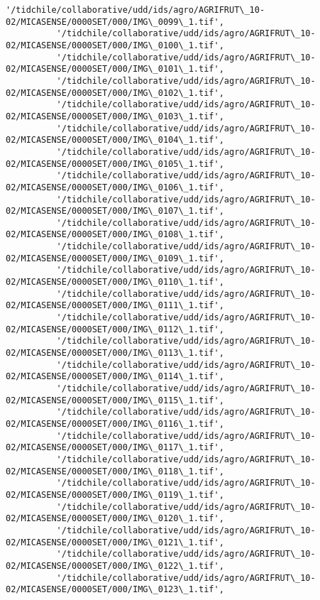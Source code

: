 \documentclass[11pt]{article}
\begin{document}
\begin{Verbatim}[commandchars=\\\{\}]
          '/tidchile/collaborative/udd/ids/agro/AGRIFRUT\_10-02/MICASENSE/0000SET/000/IMG\_0099\_1.tif',
          '/tidchile/collaborative/udd/ids/agro/AGRIFRUT\_10-02/MICASENSE/0000SET/000/IMG\_0100\_1.tif',
          '/tidchile/collaborative/udd/ids/agro/AGRIFRUT\_10-02/MICASENSE/0000SET/000/IMG\_0101\_1.tif',
          '/tidchile/collaborative/udd/ids/agro/AGRIFRUT\_10-02/MICASENSE/0000SET/000/IMG\_0102\_1.tif',
          '/tidchile/collaborative/udd/ids/agro/AGRIFRUT\_10-02/MICASENSE/0000SET/000/IMG\_0103\_1.tif',
          '/tidchile/collaborative/udd/ids/agro/AGRIFRUT\_10-02/MICASENSE/0000SET/000/IMG\_0104\_1.tif',
          '/tidchile/collaborative/udd/ids/agro/AGRIFRUT\_10-02/MICASENSE/0000SET/000/IMG\_0105\_1.tif',
          '/tidchile/collaborative/udd/ids/agro/AGRIFRUT\_10-02/MICASENSE/0000SET/000/IMG\_0106\_1.tif',
          '/tidchile/collaborative/udd/ids/agro/AGRIFRUT\_10-02/MICASENSE/0000SET/000/IMG\_0107\_1.tif',
          '/tidchile/collaborative/udd/ids/agro/AGRIFRUT\_10-02/MICASENSE/0000SET/000/IMG\_0108\_1.tif',
          '/tidchile/collaborative/udd/ids/agro/AGRIFRUT\_10-02/MICASENSE/0000SET/000/IMG\_0109\_1.tif',
          '/tidchile/collaborative/udd/ids/agro/AGRIFRUT\_10-02/MICASENSE/0000SET/000/IMG\_0110\_1.tif',
          '/tidchile/collaborative/udd/ids/agro/AGRIFRUT\_10-02/MICASENSE/0000SET/000/IMG\_0111\_1.tif',
          '/tidchile/collaborative/udd/ids/agro/AGRIFRUT\_10-02/MICASENSE/0000SET/000/IMG\_0112\_1.tif',
          '/tidchile/collaborative/udd/ids/agro/AGRIFRUT\_10-02/MICASENSE/0000SET/000/IMG\_0113\_1.tif',
          '/tidchile/collaborative/udd/ids/agro/AGRIFRUT\_10-02/MICASENSE/0000SET/000/IMG\_0114\_1.tif',
          '/tidchile/collaborative/udd/ids/agro/AGRIFRUT\_10-02/MICASENSE/0000SET/000/IMG\_0115\_1.tif',
          '/tidchile/collaborative/udd/ids/agro/AGRIFRUT\_10-02/MICASENSE/0000SET/000/IMG\_0116\_1.tif',
          '/tidchile/collaborative/udd/ids/agro/AGRIFRUT\_10-02/MICASENSE/0000SET/000/IMG\_0117\_1.tif',
          '/tidchile/collaborative/udd/ids/agro/AGRIFRUT\_10-02/MICASENSE/0000SET/000/IMG\_0118\_1.tif',
          '/tidchile/collaborative/udd/ids/agro/AGRIFRUT\_10-02/MICASENSE/0000SET/000/IMG\_0119\_1.tif',
          '/tidchile/collaborative/udd/ids/agro/AGRIFRUT\_10-02/MICASENSE/0000SET/000/IMG\_0120\_1.tif',
          '/tidchile/collaborative/udd/ids/agro/AGRIFRUT\_10-02/MICASENSE/0000SET/000/IMG\_0121\_1.tif',
          '/tidchile/collaborative/udd/ids/agro/AGRIFRUT\_10-02/MICASENSE/0000SET/000/IMG\_0122\_1.tif',
          '/tidchile/collaborative/udd/ids/agro/AGRIFRUT\_10-02/MICASENSE/0000SET/000/IMG\_0123\_1.tif',

\end{Verbatim}
\end{document}
